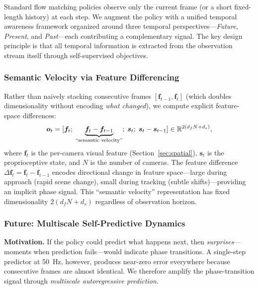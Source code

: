 Standard flow matching policies observe only the current frame (or a short fixed-length history) at each step. We augment the policy with a unified temporal awareness framework organized around three temporal perspectives---\emph{Future}, \emph{Present}, and \emph{Past}---each contributing a complementary signal. The key design principle is that all temporal information is extracted from the observation stream itself through self-supervised objectives.

\subsubsection{Semantic Velocity via Feature Differencing}
\label{sec:temporal_diff}

Rather than naively stacking consecutive frames $[\bm{f}_{t-1}, \bm{f}_t]$ (which doubles dimensionality without encoding \emph{what changed}), we compute explicit feature-space differences:
\begin{equation}
    \bm{o}_t = [\bm{f}_t;\; \underbrace{\bm{f}_t - \bm{f}_{t-1}}_{\text{``semantic velocity''}};\; \bm{s}_t;\; \bm{s}_t - \bm{s}_{t-1}] \in \mathbb{R}^{2(d_f N + d_s)},
    \label{eq:temporal_obs}
\end{equation}
where $\bm{f}_t$ is the per-camera visual feature (Section~\ref{sec:spatial}), $\bm{s}_t$ is the proprioceptive state, and $N$ is the number of cameras. The feature difference $\Delta \bm{f}_t = \bm{f}_t - \bm{f}_{t-1}$ encodes directional change in feature space---large during approach (rapid scene change), small during tracking (subtle shifts)---providing an implicit phase signal. This ``semantic velocity'' representation has fixed dimensionality $2(d_f N + d_s)$ regardless of observation horizon.

\subsubsection{Future: Multiscale Self-Predictive Dynamics}
\label{sec:dynamics}

\textbf{Motivation.} If the policy could predict what happens next, then \emph{surprises}---moments when prediction fails---would indicate phase transitions. A single-step predictor at 50~Hz, however, produces near-zero error everywhere because consecutive frames are almost identical. We therefore amplify the phase-transition signal through \emph{multiscale autoregressive prediction}.

